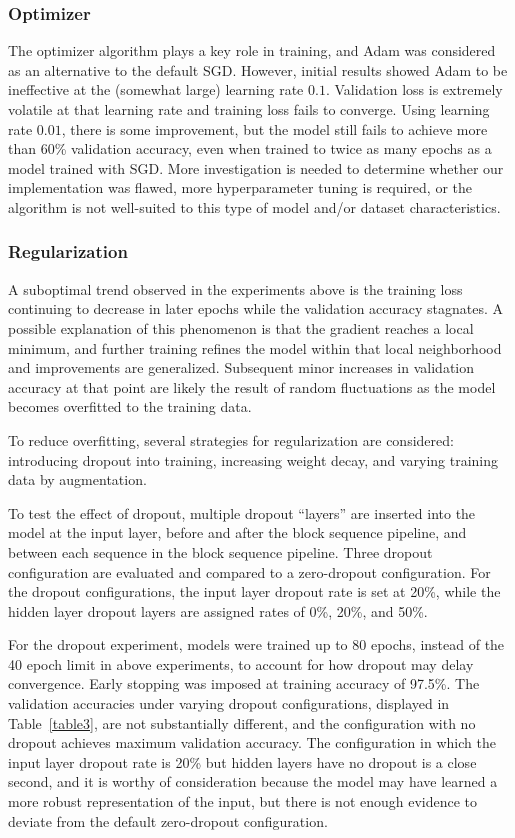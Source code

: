 \documentclass[letterpaper]{article} %
\begin{document}
\subsubsection{Optimizer}

The optimizer algorithm plays a key role in training, and Adam was considered as an alternative to the default SGD\@.
However, initial results showed Adam to be ineffective at the (somewhat large) learning rate $ 0.1 $.
Validation loss is extremely volatile
at that learning rate and training loss fails to converge.
Using learning rate $ 0.01 $, there is some improvement, but the model still fails to achieve more than 60\% validation
accuracy, even when trained to twice as many epochs as a model trained with SGD. More investigation is needed to
determine whether our implementation was flawed, more hyperparameter tuning is required, or
the algorithm is not well-suited to this type of model and/or dataset characteristics.

\subsubsection{Regularization}

A suboptimal trend observed in the experiments above is the training loss continuing to decrease in later
epochs while the validation accuracy stagnates.
A possible explanation of this phenomenon is that the gradient reaches a local minimum, and further training
refines the model within that local neighborhood and improvements are generalized.
Subsequent minor increases in validation accuracy at that point are likely the result of random fluctuations as the
model becomes overfitted to the training data.

To reduce overfitting, several strategies for regularization are considered:
introducing dropout into training, increasing weight decay, and varying training data by augmentation.

To test the effect of dropout, multiple dropout ``layers'' are inserted into the model at the input layer,
before and after the block sequence pipeline, and between each sequence in the block sequence pipeline.
Three dropout configuration are evaluated and compared to a zero-dropout configuration.
For the dropout configurations, the input layer dropout rate is set at 20\%, while the hidden layer
dropout layers are assigned rates of 0\%, 20\%, and 50\%.

For the dropout experiment, models were trained up to 80 epochs, instead of the 40 epoch limit in above experiments,
to account for how dropout may delay convergence.
Early stopping was imposed at training accuracy of 97.5\%.
The validation accuracies under varying dropout configurations, displayed in Table~\ref{table3},
are not substantially different, and the configuration with no dropout achieves maximum validation accuracy.
The configuration in which the input layer dropout rate is 20\% but hidden layers have no dropout
is a close second, and it is worthy of consideration because the model may have learned a more robust
representation of the input, but there is not enough evidence to deviate from the default zero-dropout
configuration.
\end{document}
